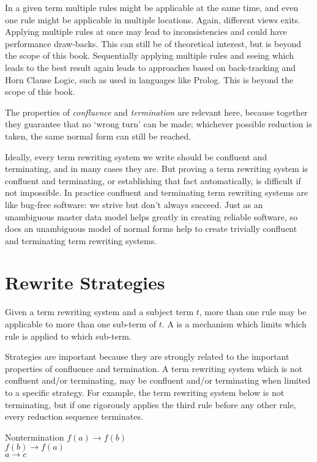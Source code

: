 \documentclass[11pt,twoside]{memoir}
\newcommand{\D}[1]{\index{#1}\defn{#1}}
\def\E{\emph} %
\begin{document}
In a given term multiple rules might be applicable at the same time, and even one rule might be applicable in multiple locations. Again, different views exits. Applying multiple rules at once may lead to inconsistencies and could have performance draw-backs. This can still be of theoretical interest, but is beyond the scope of this book. Sequentially applying multiple rules and seeing which leads to the best result again leads to approaches based on back-tracking and Horn Clause Logic, such as used in languages like Prolog. This is beyond the scope of this book.

The properties of \E{confluence} and \E{termination} are relevant here, because together they guarantee that no `wrong turn' can be made; whichever possible reduction is taken, the same normal form can still be reached.

Ideally, every term rewriting system we write should be confluent and terminating, and in many cases they are. But proving a term rewriting system is confluent and terminating, or establishing that fact automatically, is difficult if not impossible. In practice confluent and terminating term rewriting systems are like bug-free software: we strive but don't always succeed. Just as an unambiguous master data model helps greatly in creating reliable software, so does an unambiguous model of normal forms help to create trivially confluent and terminating term rewriting systems.

\section{Rewrite Strategies}
\label{sect:rs}


Given a  term rewriting system and a subject term $t$, more than one rule may be applicable to more than one sub-term of $t$. A \D{strategy} is a mechanism which limits which rule is applied to which sub-term.

Strategies are important because they are strongly related to the important properties of confluence and termination. A term rewriting system which is not confluent and/or terminating, may be confluent and/or terminating when limited to a specific strategy. For example, the term rewriting system below is not terminating, but if one rigorously applies the third rule before any other rule, every reduction sequence terminates.

\begin{trs}{Nontermination}{}
	$f(a) \to f(b)$\label{code:n}\\
	$f(b) \to f(a)$\\
	$a \to c$
\end{trs}
\end{document}
